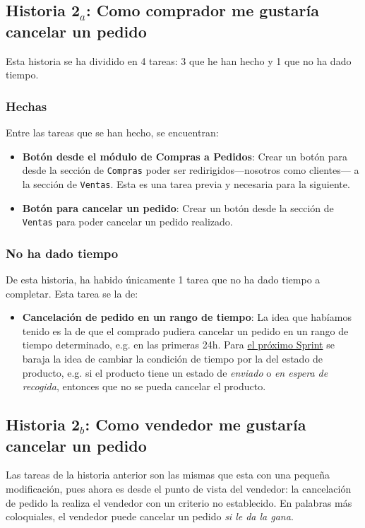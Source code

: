 \documentclass[12pt, a4paper, twoside]{article} %
\newcommand{\B}[1]{\textbf{#1}}
\newcommand{\ti}{\emph} %
\newcommand{\ul}{\underline}
\begin{document}
\subsection{Historia 2$_{a}$: Como comprador me gustaría cancelar un pedido}

Esta historia se ha dividido en 4 tareas: 3 que he han hecho y 1 que no ha dado tiempo.

\subsubsection{Hechas}
Entre las tareas que se han hecho, se encuentran:
\begin{itemize}
    \item  \B{Botón desde el módulo de Compras a Pedidos}: Crear un botón para desde la sección de \texttt{Compras} poder ser redirigidos---nosotros como clientes--- a la sección de \texttt{Ventas}. Esta es una tarea previa y necesaria para la siguiente.
    
    \item \B{Botón para cancelar un pedido}: Crear un botón desde la sección de \texttt{Ventas} para poder cancelar un pedido realizado.
\end{itemize}

\subsubsection{No ha dado tiempo}
De esta historia, ha habido únicamente 1 tarea que no ha dado tiempo a completar. Esta tarea se la de:
\begin{itemize}
    \item  \B{Cancelación de pedido en un rango de tiempo}: La idea que habíamos tenido es la de que el comprado pudiera cancelar un pedido en un rango de tiempo determinado, e.g. en las primeras 24h. Para \ul{el próximo Sprint} se baraja la idea de cambiar la condición de tiempo por la del estado de producto, e.g. si el producto tiene un estado de \ti{enviado} o \ti{en espera de recogida}, entonces que no se pueda cancelar el producto.
\end{itemize}

\subsection{Historia 2$_{b}$: Como vendedor me gustaría cancelar un pedido}

Las tareas de la historia anterior son las mismas que esta con una pequeña modificación, pues ahora es desde el punto de vista del vendedor: la cancelación de pedido la realiza el vendedor con un criterio no establecido. En palabras más coloquiales, el vendedor puede cancelar un pedido \ti{si le da la gana}. 
\end{document}
